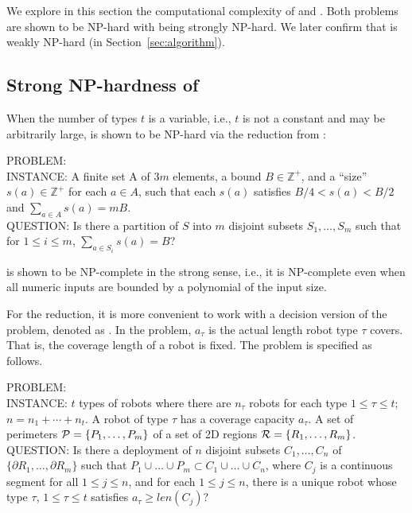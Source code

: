 We explore in this section the computational complexity of \opglr 
and \opgmc. Both problems are shown to be NP-hard with \opglr 
being strongly NP-hard. We later confirm that \opgmc is weakly 
NP-hard (in Section~\ref{sec:algorithm}).

\subsection{Strong NP-hardness of \opglr}\label{subsec:opglr-hardness}
When the number of types $t$ is a variable, i.e., $t$ is not a constant
and may be arbitrarily large,
\opglr is shown to be NP-hard via the reduction from \tpart \cite{garey1975complexity}:

\vspace*{1mm}
\noindent
PROBLEM: \tpart\\
INSTANCE: A finite set A of $3m$ elements, a bound $B\in \mathbb{Z^+}$, 
and a ``size'' $s(a)\in \mathbb{Z^+}$ for each $a\in A$,
such that each $s(a)$ satisfies $B/4 < s(a) <B/2$ and $\sum_{a\in A} s(a) = mB$.\\
QUESTION: Is there a partition of $S$ into $m$ disjoint subsets $S_1, 
\ldots, S_m$ such that for $1\leq i\leq m$, 
$\sum_{a\in S_i} s(a) = B$?
\vspace*{1mm}

\tpart is shown to be NP-complete in the strong sense\cite{GarJoh79}, 
i.e., it is NP-complete even when all numeric inputs are bounded by a polynomial 
of the input size. 

For the reduction, it is more convenient to work with a decision 
version of the \opglr problem, denoted as \opglrd. In the \opglrd 
problem, $a_{\tau}$ is the actual length robot type $\tau$ covers. 
That is, the coverage length of a robot is fixed. The \opglrd problem 
is specified as follows. 

\vspace*{1mm}
\noindent
PROBLEM: \opglrd\\
INSTANCE: $t$ types of robots where there are $n_{\tau}$ robots for 
each type $1 \le \tau \le t$; $n = n_1 + \cdots + n_t$. A robot of 
type $\tau$ has a coverage capacity $a_{\tau}$. A set of perimeters 
$\P = \{P_1, \ldots, P_m\}$ of a set of 2D regions 
$\R =\{R_1, \ldots, R_m\}$.\\ 
QUESTION: Is there a deployment of $n$ disjoint subsets $C_1, \ldots, C_n$
of $\{\partial R_1, \ldots, \partial R_m\}$ such that 
$P_1 \cup \ldots \cup P_m \subset C_1 \cup \ldots \cup C_n$, where
$C_j$ is a continuous segment for all $1 \le j \le n$, and for each 
$1 \le j \le n$, there is a unique robot whose type $\tau$, $1 \le \tau 
\le t$ satisfies $a_{\tau} \ge len(C_j)$?
\vspace*{1mm}

